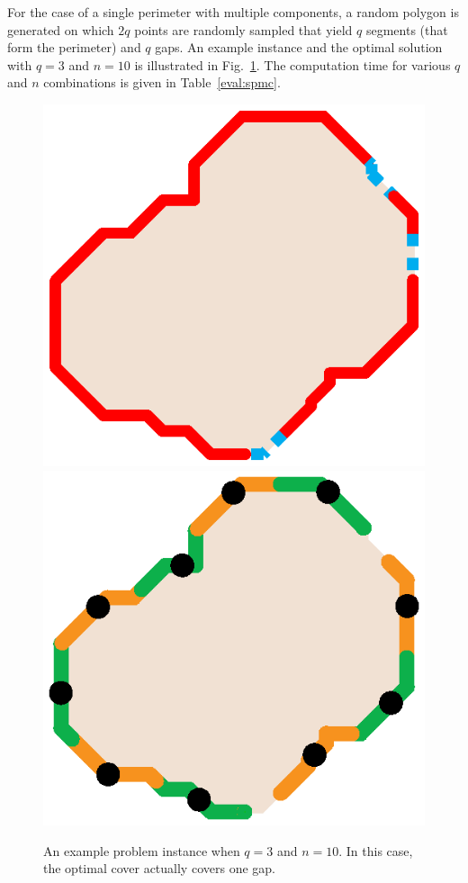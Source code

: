 For the case of a single perimeter with multiple components, a random 
polygon is generated on which $2q$ points are randomly sampled that 
yield $q$ segments (that form the perimeter) and $q$ gaps. An example 
instance and the optimal solution with $q=3$ and $n = 10$ is illustrated 
in Fig.~\ref{fig:spmc-example}. The computation time for various $q$ and 
$n$ combinations is given in Table~\ref{eval:spmc}.
\begin{figure}[ht!]
    \vspace*{-3mm}
    \centering
    \includegraphics[keepaspectratio, scale=0.4]{./chapters/opg/figures/spmc-example.eps}
    \includegraphics[keepaspectratio, scale=0.4]{./chapters/opg/figures/spmc-solution.eps}
    \vspace*{-3mm}
    \caption{\label{fig:spmc-example} 
    An example problem instance when $q = 3$ and $n = 10$. In this case, the 
		optimal cover actually covers one gap.}
    \vspace*{-4mm}
\end{figure}


